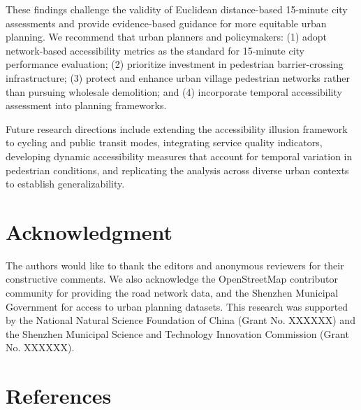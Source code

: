 \documentclass[10pt,conference,compsoc]{IEEEtran}
\begin{document}
\begin{table}[htbp]
\begin{center}
These findings challenge the validity of Euclidean distance-based 15-minute city assessments and provide evidence-based guidance for more equitable urban planning. We recommend that urban planners and policymakers: (1) adopt network-based accessibility metrics as the standard for 15-minute city performance evaluation; (2) prioritize investment in pedestrian barrier-crossing infrastructure; (3) protect and enhance urban village pedestrian networks rather than pursuing wholesale demolition; and (4) incorporate temporal accessibility assessment into planning frameworks.

Future research directions include extending the accessibility illusion framework to cycling and public transit modes, integrating service quality indicators, developing dynamic accessibility measures that account for temporal variation in pedestrian conditions, and replicating the analysis across diverse urban contexts to establish generalizability.

\section*{Acknowledgment}
\label{sec:acknowledgment}

The authors would like to thank the editors and anonymous reviewers for their constructive comments. We also acknowledge the OpenStreetMap contributor community for providing the road network data, and the Shenzhen Municipal Government for access to urban planning datasets. This research was supported by the National Natural Science Foundation of China (Grant No. XXXXXX) and the Shenzhen Municipal Science and Technology Innovation Commission (Grant No. XXXXXX).

\section*{References}
\label{sec:references}




\appendices

\end{center}
\end{table}
\end{document}

